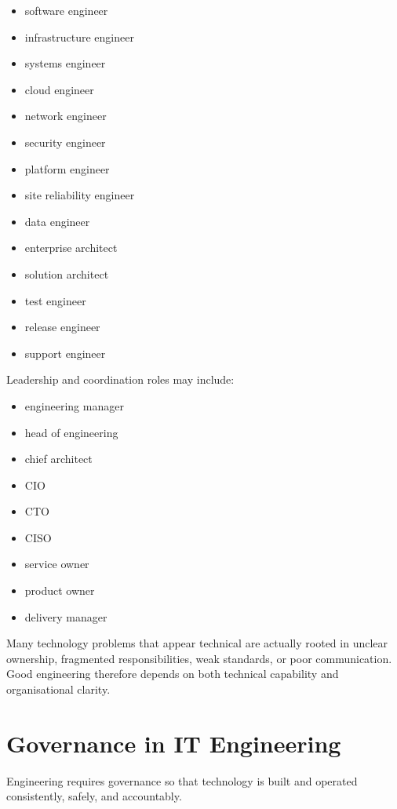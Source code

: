 \documentclass[
  british,
  letterpaper,
  DIV=11,
  numbers=noendperiod]{scrartcl}
\providecommand{\tightlist}{%
  \setlength{\itemsep}{0pt}\setlength{\parskip}{0pt}}
\begin{document}
\begin{itemize}
\tightlist
\item
  software engineer
\item
  infrastructure engineer
\item
  systems engineer
\item
  cloud engineer
\item
  network engineer
\item
  security engineer
\item
  platform engineer
\item
  site reliability engineer
\item
  data engineer
\item
  enterprise architect
\item
  solution architect
\item
  test engineer
\item
  release engineer
\item
  support engineer
\end{itemize}

Leadership and coordination roles may include:

\begin{itemize}
\tightlist
\item
  engineering manager
\item
  head of engineering
\item
  chief architect
\item
  CIO
\item
  CTO
\item
  CISO
\item
  service owner
\item
  product owner
\item
  delivery manager
\end{itemize}

Many technology problems that appear technical are actually rooted in
unclear ownership, fragmented responsibilities, weak standards, or poor
communication. Good engineering therefore depends on both technical
capability and organisational clarity.

\section{Governance in IT
Engineering}\label{governance-in-it-engineering}

Engineering requires governance so that technology is built and operated
consistently, safely, and accountably.
\end{document}
